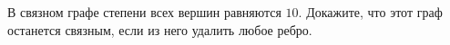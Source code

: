 В связном графе степени всех вершин равняются $10$. Докажите, что этот граф останется связным, если из него удалить любое
ребро.